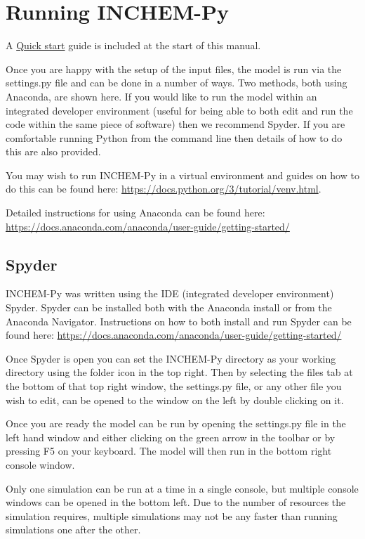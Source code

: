 \documentclass[a4paper]{refart}
\begin{document}
\newpage
\section{Running INCHEM-Py}
A \hyperref[Quick start]{Quick start} guide is included at the start of this manual. 

Once you are happy with the setup of the input files, the model is run via the settings.py file and can be done in a number of ways. Two methods, both using Anaconda, are shown here. If you would like to run the model within an integrated developer environment (useful for being able to both edit and run the code within the same piece of software) then we recommend Spyder. If you are comfortable running Python from the command line then details of how to do this are also provided.

You may wish to run INCHEM-Py in a virtual environment and guides on how to do this can be found here: \url{https://docs.python.org/3/tutorial/venv.html}.

Detailed instructions for using Anaconda can be found here: \url{https://docs.anaconda.com/anaconda/user-guide/getting-started/}

\subsection{Spyder}
INCHEM-Py was written using the IDE (integrated developer environment) Spyder. Spyder can be installed both with the Anaconda install or from the Anaconda Navigator. Instructions on how to both install and run Spyder can be found here: \url{https://docs.anaconda.com/anaconda/user-guide/getting-started/}

Once Spyder is open you can set the INCHEM-Py directory as your working directory using the folder icon in the top right. Then by selecting the files tab at the bottom of that top right window, the settings.py file, or any other file you wish to edit, can be opened to the window on the left by double clicking on it.

Once you are ready the model can be run by opening the settings.py file in the left hand window and either clicking on the green arrow in the toolbar or by pressing F5 on your keyboard. The model will then run in the bottom right console window.

Only one simulation can be run at a time in a single console, but multiple console windows can be opened in the bottom left. Due to the number of resources the simulation requires, multiple simulations may not be any faster than running simulations one after the other.
\end{document}
